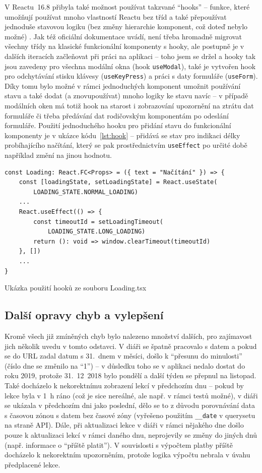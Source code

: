 V Reactu~16.8 přibyla také možnost používat takzvané \enquote{hooks} -- funkce, které umožňují používat mnoho vlastností Reactu bez tříd a také přepoužívat jednoduše stavovou logiku (bez změny hierarchie komponent, což doteď nebylo možné) \cite{react-docs-hooks}. Jak též oficiální dokumentace \cite{react-docs-hooks} uvádí, není třeba hromadně migrovat všechny třídy na klasické funkcionální komponenty s hooky, ale postupně je v dalších iteracích začleňovat při práci na aplikaci -- toho jsem se držel a hooky tak jsou zavedeny pro všechna modální okna (hook \verb|useModal|), také je vytvořen hook pro odchytávání stisku klávesy (\verb|useKeyPress|) a práci s daty formuláře (\verb|useForm|). Díky tomu bylo možné v rámci jednoduchých komponent umožnit používání stavu a také dodat (a znovupoužívat) mnoho logiky ke stavu navíc -- v případě modálních oken má totiž hook na starost i zobrazování upozornění na ztrátu dat formuláře či třeba předávání dat rodičovským komponentám po odeslání formuláře. Použití jednoduchého hooku pro přidání stavu do funkcionální komponenty je v ukázce kódu~\ref{lst:hook} -- přidává se stav pro indikaci délky probíhajícího načítání, který se pak prostřednictvím \verb|useEffect| po určité době například změní na jinou hodnotu.

\begin{listing}[ht]
	\begin{verbatim}
const Loading: React.FC<Props> = ({ text = "Načítání" }) => {
    const [loadingState, setLoadingState] = React.useState(
        LOADING_STATE.NORMAL_LOADING)
    ...
    React.useEffect(() => {
        const timeoutId = setLoadingTimeout(
            LOADING_STATE.LONG_LOADING)
        return (): void => window.clearTimeout(timeoutId)
    }, [])
    ...
}
	\end{verbatim}
	\caption{Ukázka použití hooků ze souboru Loading.tsx}\label{lst:hook}
\end{listing}

\subsection{Další opravy chyb a vylepšení}

Kromě všech již zmíněných chyb bylo nalezeno množství dalších, pro zajímavost jich několik uvedu v tomto odstavci. V diáři se špatně pracovalo s datem a pokud se do URL zadal datum s 31.~dnem v měsíci, došlo k \enquote{přesunu do minulosti} (číslo dne se změnilo na \enquote{1}) -- v důsledku toho se v aplikaci nedalo dostat do roku 2019, protože 31.~12~2018 bylo pondělí a další týden se přepnul na listopad. Také docházelo k nekorektnímu zobrazení lekcí v předchozím dnu -- pokud by lekce byla v 1~h ráno (což je sice nereálné, ale např. v rámci testů možné), v diáři se ukázala v předchozím dni jako poslední, dělo se to z důvodu porovnávání data s časovou zónou s datem bez časové zóny (vyřešeno použitím \verb|__date| v querysetu na straně API). Dále, při aktualizaci lekce v diáři v rámci nějakého dne došlo pouze k aktualizaci lekcí v rámci daného dnu, neprojevily se změny do jiných dnů (např. informace o \enquote{příště platit}). V souvislosti s výpočtem platby příště docházelo k nekorektním upozorněním, protože logika výpočtu nebrala v úvahu předplacené lekce.

